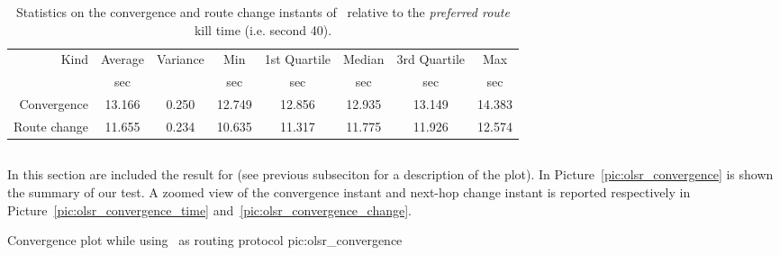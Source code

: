        \begin{table}[htbp]
            \centering
            \begin{tabular}{rccccccc}
            \toprule
            Kind & Average & Variance & Min & 1st Quartile &
            Median & 3rd Quartile & Max \\
            & \footnotesize{sec} & & \footnotesize{sec} & \footnotesize{sec} &
            \footnotesize{sec} & \footnotesize{sec} & \footnotesize{sec} \\
            \midrule
            Convergence & 13.166  & 0.250 & 12.749 & 12.856 & 12.935 & 13.149 &14.383\\
            Route change & 11.655 & 0.234 & 10.635 & 11.317 & 11.775 & 11.926 & 12.574\\
            \bottomrule
            \end{tabular}
            \caption{Statistics on the convergence and route change
              instants of \batman\ relative to the \emph{preferred
                route} kill time (i.e. second 40).}
            \label{tab:convergence_batman}
        \end{table}

\clearpage
\subsection{\olsr}
In this section are included the result for \olsr (see previous
subseciton for a description of the plot).
In Picture~\ref{pic:olsr_convergence} is shown the summary of our
test. A zoomed view of the convergence instant and next-hop change
instant is reported respectively in
Picture~\ref{pic:olsr_convergence_time}
and~\ref{pic:olsr_convergence_change}.


               {\textwidth}
               {Convergence plot while using \olsr\ as routing protocol}
               {pic:olsr_convergence}

